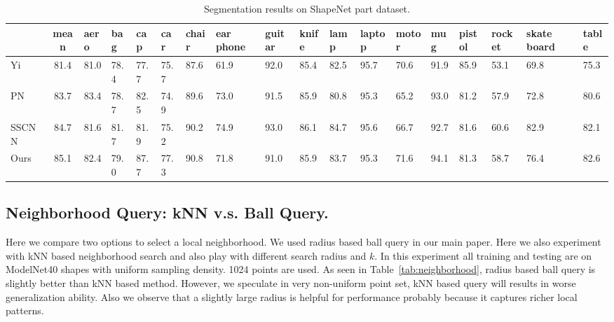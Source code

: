 \begin{table}[th!]
    \scriptsize
    \centering
    \begin{tabular}[width=\linewidth]{l|c|p{0.3cm}p{0.25cm}p{0.25cm}p{0.25cm}p{0.25cm}p{0.3cm}p{0.3cm}p{0.3cm}p{0.3cm}p{0.4cm}p{0.4cm}p{0.25cm}p{0.3cm}p{0.3cm}p{0.35cm}p{0.3cm}}
    \toprule
    ~        & mean & aero & bag & cap & car & chair & ear phone & guitar & knife & lamp & laptop & motor & mug & pistol & rocket & skate board& table \\ 
    \midrule
    Yi~\cite{Yi16} & 81.4 & 81.0 & 78.4 & 77.7 & 75.7 & 87.6 & 61.9 & 92.0 & 85.4 & 82.5 & 95.7 & 70.6 & 91.9 & 85.9 & 53.1 & 69.8 & 75.3 \\
    PN~\cite{qi2016pointnet} & 83.7 & 83.4 & 78.7 & 82.5 & 74.9 & 89.6 & 73.0 & 91.5 & 85.9 & 80.8 & 95.3 & 65.2 & 93.0 & 81.2 & 57.9 & 72.8 & 80.6 \\
    SSCNN~\cite{yi2016syncspeccnn} & 84.7 & 81.6 & 81.7 & 81.9 & 75.2 & 90.2 & 74.9 & 93.0 & 86.1 & 84.7 & 95.6 & 66.7 & 92.7 & 81.6 & 60.6 & 82.9 & 82.1 \\
    \midrule
    Ours & 85.1 & 82.4 & 79.0 & 87.7 & 77.3 & 90.8 & 71.8 & 91.0 & 85.9 & 83.7 & 95.3 & 71.6 & 94.1 & 81.3 & 58.7 & 76.4 & 82.6 \\
    \bottomrule
    \end{tabular}
    \caption{Segmentation results on ShapeNet part dataset.}
    \label{tab:partseg}
\end{table}

\subsection{Neighborhood Query: kNN v.s. Ball Query.}
Here we compare two options to select a local neighborhood. We used radius based ball query in our main paper. Here we also experiment with kNN based neighborhood search and also play with different search radius and $k$. In this experiment all training and testing are on ModelNet40 shapes with uniform sampling density. 1024 points are used. As seen in Table~\ref{tab:neighborhood}, radius based ball query is slightly better than kNN based method. However, we speculate in very non-uniform point set, kNN based query will results in worse generalization ability. Also we observe that a slightly large radius is helpful for performance probably because it captures richer local patterns.

